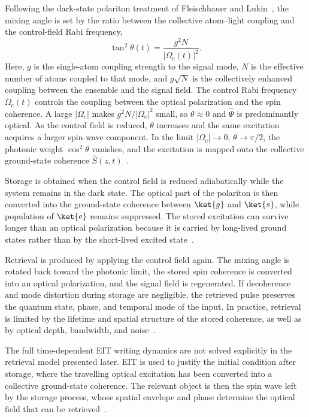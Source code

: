 Following the dark-state polariton treatment of Fleischhauer and Lukin~\cite{QmfpDp_FleischhauerEtAl_2002}, the mixing angle is set by the ratio between the collective atom--light coupling and the control-field Rabi frequency,
\begin{equation}
    \tan^2\theta(t)
    =
    \frac{g^2N}{|\Omega_{\mathrm{c}}(t)|^2}.
    \label{eq:eit_mixing_angle}
\end{equation}
Here, $g$ is the single-atom coupling strength to the signal mode, $N$ is the effective number of atoms coupled to that mode, and $g\sqrt{N}$ is the collectively enhanced coupling between the ensemble and the signal field. The control Rabi frequency $\Omega_{\mathrm{c}}(t)$ controls the coupling between the optical polarization and the spin coherence. A large $|\Omega_{\mathrm{c}}|$ makes $g^2N/|\Omega_{\mathrm{c}}|^2$ small, so $\theta\approx0$ and $\hat{\Psi}$ is predominantly optical. As the control field is reduced, $\theta$ increases and the same excitation acquires a larger spin-wave component. In the limit $|\Omega_{\mathrm{c}}|\rightarrow0$, $\theta\rightarrow\pi/2$, the photonic weight $\cos^2\theta$ vanishes, and the excitation is mapped onto the collective ground-state coherence $\hat{S}(z,t)$~\cite{QmfpDp_FleischhauerEtAl_2002,}.

Storage is obtained when the control field is reduced adiabatically while the system remains in the dark state. The optical part of the polariton is then converted into the ground-state coherence between $\ket{g}$ and $\ket{s}$, while population of $\ket{e}$ remains suppressed. The stored excitation can survive longer than an optical polarization because it is carried by long-lived ground states rather than by the short-lived excited state~\cite{QmfpDp_FleischhauerEtAl_2002,SoLiAV_PhillipsEtAl_2001,}.

Retrieval is produced by applying the control field again. The mixing angle is rotated back toward the photonic limit, the stored spin coherence is converted into an optical polarization, and the signal field is regenerated. If decoherence and mode distortion during storage are negligible, the retrieved pulse preserves the quantum state, phase, and temporal mode of the input. In practice, retrieval is limited by the lifetime and spatial structure of the stored coherence, as well as by optical depth, bandwidth, and noise~\cite{QmfpDp_FleischhauerEtAl_2002,Apgteitiav_FinkelsteinEtAl_2023}.

The full time-dependent EIT writing dynamics are not solved explicitly in the retrieval model presented later. EIT is used to justify the initial condition after storage, where the travelling optical excitation has been converted into a collective ground-state coherence. The relevant object is then the spin wave left by the storage process, whose spatial envelope and phase determine the optical field that can be retrieved~\cite{QmfpDp_FleischhauerEtAl_2002,}.


